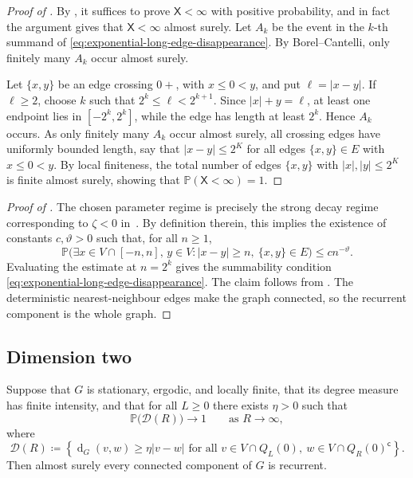 \documentclass[11pt,a4paper]{scrartcl}
\renewcommand{\P}{\mathbb{P}}
\newcommand{\1}{\mathbb{1}}
\newcommand{\dG}{\operatorname{d}_{G}}
\begin{document}
\begin{proof}[Proof of ]
By , it suffices to prove
\(\mathsf X<\infty\) with positive probability, and in fact the argument gives that $\mathsf X<\infty$ almost surely.  Let \(A_k\) be the event in the \(k\)-th summand of
\eqref{eq:exponential-long-edge-disappearance}.  By Borel--Cantelli, only
finitely many \(A_k\) occur almost surely.

Let \(\{x,y\}\) be an edge crossing \(0+\), with \(x\le0<y\), and put
\(\ell=|x-y|\).  If \(\ell\ge2\), choose \(k\) such that
\(2^k\le \ell<2^{k+1}\).  Since \(|x|+y=\ell\), at least one endpoint lies in
\([-2^k,2^k]\), while the edge has length at least \(2^k\).  Hence \(A_k\)
occurs.  As only finitely many \(A_k\) occur almost surely, all crossing edges
have uniformly bounded length, say that $|x-y| \leq 2^K$ for all edges $\{x,y\}\in E$ with $x\leq 0 < y$.  By local finiteness, the total number of edges $\{x,y\}$ with $|x|, |y| \leq 2^{K}$ is finite almost surely, showing that $\P(\mathsf X<\infty)=1$.
\end{proof}

\begin{proof}[Proof of ]
The chosen parameter regime is precisely the strong decay regime corresponding to \(\zeta<0\) in~\cite{jacobJahLu2024}. By definition therein, this implies the existence of constants \(c,\vartheta>0\) such that, for all \(n\ge1\),
\[
  \P\big(
    \exists x\in V\cap[-n,n],\,y\in V:
    |x-y|\ge n,\ \{x,y\}\in E
  \big)\le c n^{-\vartheta}.
\]
Evaluating
the estimate at \(n=2^k\) gives the summability condition
\eqref{eq:exponential-long-edge-disappearance}.  The claim follows from
.  The deterministic nearest-neighbour
edges make the graph connected, so the recurrent component is the whole graph.
\end{proof}

\subsection{Dimension two}
\label{sec:proofs-d2}

\begin{proposition}
\label{prop:fixed-box-distance-rec}
Suppose that \(G\) is stationary, ergodic, and locally finite, that its degree
measure has finite intensity, and that for all $L \geq 0$ there exists \(\eta>0\) such that
\begin{equation}
\label{eq:fixed-box-distance}
  \P\big(\mathcal D(R)\big)\longrightarrow1
  \qquad\text{as }R\to\infty,
\end{equation}
where
\[
  \mathcal D(R)\coloneqq 
  \left\{
    \dG(v,w)\ge\eta|v-w|
    \text{ for all }v\in V\cap Q_L(0),\
    w\in V\cap Q_R(0)^{\mathsf c}
  \right\}.
\]
Then almost surely every connected component of
\(G\) is recurrent.
\end{proposition}
\end{document}
